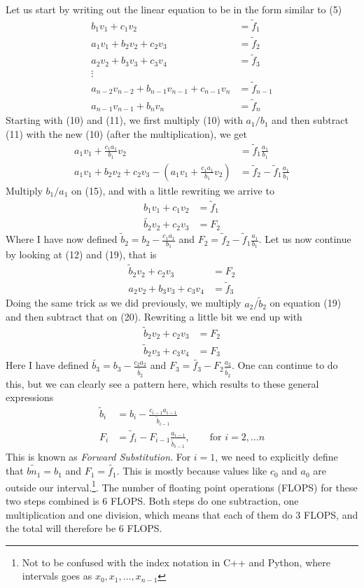 \documentclass[12pt]{article}
\begin{document}
Let us start by writing out the linear equation to be in the form similar to (5)
\begin{align}
b_1v_1 + c_1v_2 &= \tilde{f}_1 \\
a_1v_1 + b_2v_2 + c_2v_3 &= \tilde{f}_2 \\
a_2v_2 + b_3v_3 + c_3v_4 &= \tilde{f}_3 \\
\vdots \nonumber \\
a_{n-2}v_{n-2} + b_{n-1}v_{n-1} + c_{n-1} v_n &= \tilde{f}_{n-1}\\
a_{n-1}v_{n-1} + b_n v_n &= \tilde{f}_n
\end{align}
Starting with (10) and (11), we first multiply (10) with $a_1/b_1$ and then subtract (11) with the new (10) (after the multiplication), we get
\begin{align}
a_1v_1 + \frac{c_1 a_1}{b_1}v_2 &= \tilde{f}_1\frac{a_1}{b_1}  \\
a_1v_1 + b_2v_2 + c_2v_3 - (a_1v_1 + \frac{c_1 a_1}{b_1} v_2) &= \tilde{f}_2 - \tilde{f}_1\frac{a_1}{b_1}
\end{align}
Multiply $b_1/a_1$ on (15), and with a little rewriting we arrive to
\begin{align}
b_1v_1 + c_1v_2 &= \tilde{f}_1 \\
\tilde{b_2}v_2 + c_2v_3 &= F_2
\end{align}
Where I have now defined $\tilde{b}_2 = b_2 - \frac{c_1 a_1}{b_1}$ and $F_2 = \tilde{f}_2 - \tilde{f}_1\frac{a_1}{b_1}$. Let us now continue by looking at (12) and (19), that is
\begin{align}
\tilde{b}_2 v_2 + c_2 v_3 &= F_2 \\
a_2 v_2 + b_3 v_3 + c_3 v_4 &= \tilde{f}_3
\end{align}
Doing the same trick as we did previously, we multiply $a_2/\tilde{b}_2$ on equation (19) and then subtract that on (20). Rewriting a little bit we end up with
\begin{align}
\tilde{b}_2 v_2 + c_2 v_3 &= F_2 \\
\tilde{b}_2 v_3 + c_3v_4 &= F_3
\end{align}
Here I have defined $\tilde{b_3} = b_3 - \frac{c_2 a_2}{\tilde{b_2}}$ and $F_3 = \tilde{f_3} - F_2\frac{a_2}{\tilde{b_2}}$. One can continue to do this, but we can clearly see a pattern here, which results to these general expressions
\begin{align}
\tilde{b}_i &= b_i - \frac{c_{i-1} a_{i-1}}{\tilde{b}_{i-1}}\\
F_i &= \tilde{f}_i - F_{i-1}\frac{a_{i-1}}{\tilde{b}_{i-1}}, \qquad \text{for } i=2,...n
\end{align}
This is known as \textit{Forward Substitution}. For $i=1$, we need to explicitly define that $\tilde{bn_1} = b_1$ and $F_1 = \tilde{f_1}$. This is mostly because values like $c_0$ and $a_0$ are outside our interval.\footnote{Not to be confused with the index notation in C++ and Python, where intervals goes as $x_0, x_1, ... , x_{n-1}$}. The number of floating point operations (FLOPS) for these two steps combined is	 $6$ FLOPS. Both steps do one subtraction, one multiplication and one division, which means that each of them do $3$ FLOPS, and the total will therefore be $6$ FLOPS.
\end{document}
